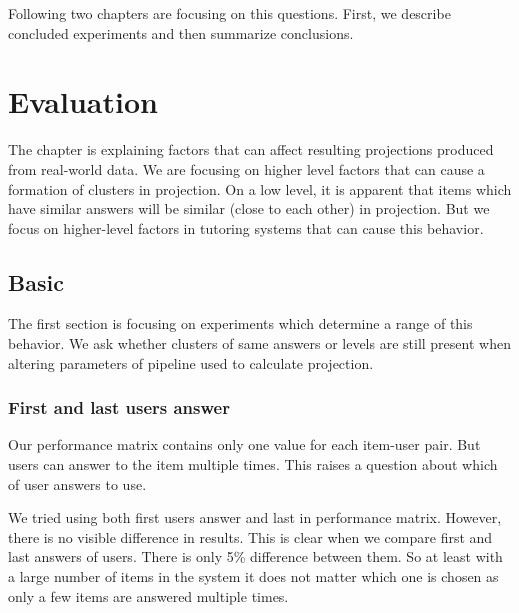 \documentclass[
  digital, %
  table,   %
  nolof,     %
  nolot,     %
  nocover,
  color,
  final, %
]{fithesis3}
\begin{document}

Following two chapters are focusing on this questions. First, we describe concluded experiments and then summarize conclusions.


\chapter{Evaluation}\label{evaluation}

The chapter is explaining factors that can affect resulting projections produced from real-world data. We are focusing on higher level factors that can cause a formation of clusters in projection. On a low level, it is apparent that items which have similar answers will be similar (close to each other) in projection. But we focus on higher-level factors in tutoring systems that can cause this behavior.


\section{Basic}\label{evaluation-basic}

The first section is focusing on experiments which determine a range of this behavior. We ask whether clusters of same answers or levels are still present when altering parameters of pipeline used to calculate projection.


\subsection{First and last users answer}\label{first-and-last-users-answer}


Our performance matrix contains only one value for each item-user pair. But users can answer to the item multiple times. This raises a question about which of user answers to use.


We tried using both first users answer and last in performance matrix. However, there is no visible difference in results. This is clear when we compare first and last answers of users. There is only 5\% difference between them. So at least with a large number of items in the system it does not matter which one is chosen as only a few items are answered multiple times.
\end{document}
